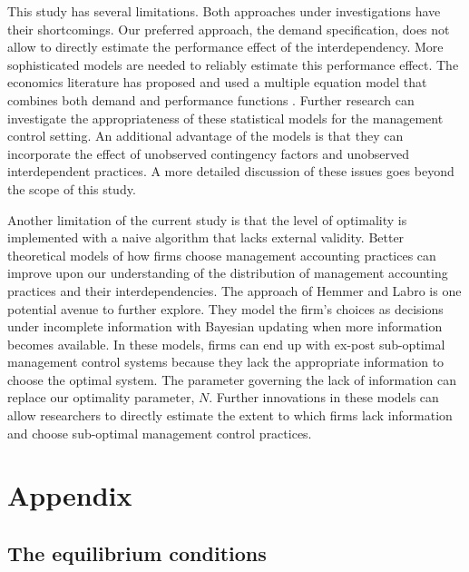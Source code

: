 \documentclass[12pt]{article}
\begin{document}
This study has several limitations. Both approaches under investigations
have their shortcomings. Our preferred approach, the demand
specification, does not allow to directly estimate the performance
effect of the interdependency. More sophisticated models are needed to
reliably estimate this performance effect. The economics literature has
proposed and used a multiple equation model that combines both demand
and performance functions
\citep{Athey1998, Gentzkow2007, Kretschmer2012, Miravete2006}. Further
research can investigate the appropriateness of these statistical models
for the management control setting. An additional advantage of the
models is that they can incorporate the effect of unobserved contingency
factors and unobserved interdependent practices. A more detailed
discussion of these issues goes beyond the scope of this study.

Another limitation of the current study is that the level of optimality
is implemented with a naive algorithm that lacks external validity.
Better theoretical models of how firms choose management accounting
practices can improve upon our understanding of the distribution of
management accounting practices and their interdependencies. The
approach of Hemmer and Labro \citeyearpar{Hemmer2015} is one potential
avenue to further explore. They model the firm's choices as decisions
under incomplete information with Bayesian updating when more
information becomes available. In these models, firms can end up with
ex-post sub-optimal management control systems because they lack the
appropriate information to choose the optimal system. The parameter
governing the lack of information can replace our optimality parameter,
\(N\). Further innovations in these models can allow researchers to
directly estimate the extent to which firms lack information and choose
sub-optimal management control practices.

\pagebreak

\appendix
\renewcommand{\theequation}{A.\arabic{equation}}
\setcounter{equation}{0}

\section{Appendix}\label{appendix}

\subsection{The equilibrium
conditions}\label{the-equilibrium-conditions}
\end{document}
